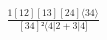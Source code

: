 \documentclass[varwidth, border=5pt]{standalone}
\begin{document}
\begin{my}
$\begin{gathered}
\scriptscriptstyle\frac{1[12][13][24]⟨34⟩}{[34]²⟨4|2+3|4]}
\end{gathered}$
\end{my}
\end{document}

